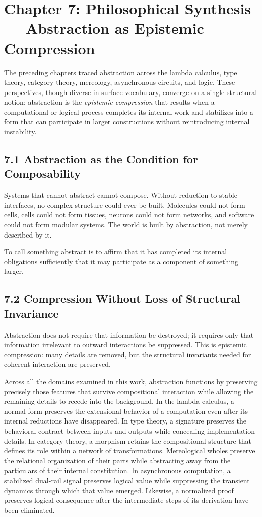 \documentclass[12pt,letterpaper]{article}
\theoremstyle{remark}
\begin{document}
\section{Chapter 7: Philosophical Synthesis — Abstraction as Epistemic Compression}

The preceding chapters traced abstraction across the lambda calculus, type theory, category theory, mereology, asynchronous circuits, and logic. These perspectives, though diverse in surface vocabulary, converge on a single structural notion: abstraction is the \emph{epistemic compression} that results when a computational or logical process completes its internal work and stabilizes into a form that can participate in larger constructions without reintroducing internal instability.

\subsection{7.1 Abstraction as the Condition for Composability}

Systems that cannot abstract cannot compose. Without reduction to stable interfaces, no complex structure could ever be built. Molecules could not form cells, cells could not form tissues, neurons could not form networks, and software could not form modular systems. The world is built by abstraction, not merely described by it.

To call something abstract is to affirm that it has completed its internal obligations sufficiently that it may participate as a component of something larger.

\subsection{7.2 Compression Without Loss of Structural Invariance}

Abstraction does not require that information be destroyed; it requires only that information irrelevant to outward interactions be suppressed. This is epistemic compression: many details are removed, but the structural invariants needed for coherent interaction are preserved.

Across all the domains examined in this work, abstraction functions by preserving precisely those features that survive compositional interaction while allowing the remaining details to recede into the background. In the lambda calculus, a normal form preserves the extensional behavior of a computation even after its internal reductions have disappeared. In type theory, a signature preserves the behavioral contract between inputs and outputs while concealing implementation details. In category theory, a morphism retains the compositional structure that defines its role within a network of transformations. Mereological wholes preserve the relational organization of their parts while abstracting away from the particulars of their internal constitution. In asynchronous computation, a stabilized dual-rail signal preserves logical value while suppressing the transient dynamics through which that value emerged. Likewise, a normalized proof preserves logical consequence after the intermediate steps of its derivation have been eliminated.
\end{document}
